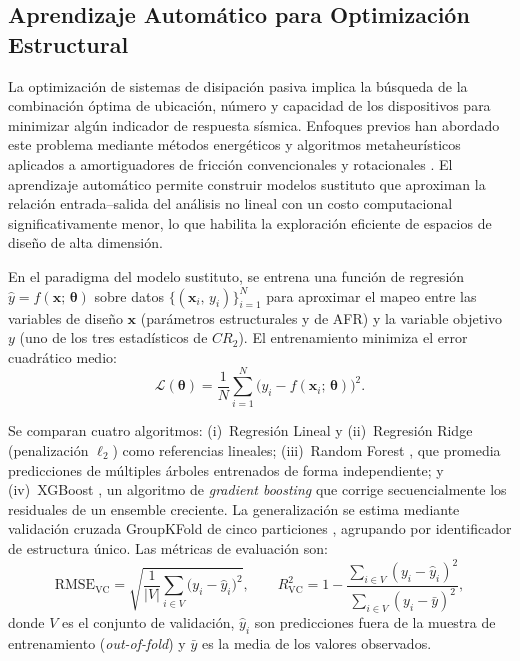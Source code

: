 \documentclass[preprint,12pt,authoryear]{elsarticle}
\newcommand{\RMSE}{\mathrm{RMSE_{VC}}}       %
\newcommand{\Rsq}{R^{2}_{\mathrm{VC}}}
\begin{document}
\subsection{Aprendizaje Automático para Optimización Estructural}
\label{sec:theory:ml}

La optimización de sistemas de disipación pasiva implica la búsqueda de la
combinación óptima de ubicación, número y capacidad de los dispositivos para
minimizar algún indicador de respuesta sísmica. Enfoques previos han abordado
este problema mediante métodos energéticos y algoritmos metaheurísticos aplicados
a amortiguadores de fricción convencionales y rotacionales
\citep{moreschi_design_2003, moghaddam_optimal_2022, ontiveros-perez_reliability-based_2019}.
El aprendizaje automático permite construir modelos sustituto que aproximan la
relación entrada--salida del análisis no lineal con un costo computacional
significativamente menor, lo que habilita la exploración eficiente de espacios
de diseño de alta dimensión.

En el paradigma del modelo sustituto, se entrena una función de regresión
$\hat{y} = f(\bm{x};\,\bm{\theta})$ sobre datos $\{(\bm{x}_i,\,y_i)\}_{i=1}^{N}$
para aproximar el mapeo entre las variables de diseño $\bm{x}$ (parámetros
estructurales y de AFR) y la variable objetivo $y$ (uno de los tres estadísticos
de $CR_2$). El entrenamiento minimiza el error cuadrático medio:
\begin{equation}
    \mathcal{L}(\bm{\theta}) = \frac{1}{N}\sum_{i=1}^{N}
    \bigl(y_i - f(\bm{x}_i;\,\bm{\theta})\bigr)^2.
    \label{eq:mse}
\end{equation}

Se comparan cuatro algoritmos: (i)~Regresión Lineal y (ii)~Regresión Ridge
(penalización $\ell_2$) como referencias lineales; (iii)~Random Forest
\citep{Breiman2001}, que promedia predicciones de múltiples árboles entrenados
de forma independiente; y (iv)~XGBoost \citep{Chen2016}, un algoritmo de
\textit{gradient boosting} que corrige secuencialmente los residuales de un
ensemble creciente. La generalización se estima mediante validación cruzada
GroupKFold de cinco particiones \citep{Kazemi2022}, agrupando por identificador
de estructura único. Las métricas de evaluación son:
\begin{equation}
    \RMSE = \sqrt{\frac{1}{|V|}\sum_{i \in V}\bigl(y_i - \hat{y}_i\bigr)^2},
    \qquad
    \Rsq  = 1 - \frac{\sum_{i \in V}(y_i - \hat{y}_i)^2}
                      {\sum_{i \in V}(y_i - \bar{y})^2},
    \label{eq:metrics}
\end{equation}
donde $V$ es el conjunto de validación, $\hat{y}_i$ son predicciones fuera de la
muestra de entrenamiento (\textit{out-of-fold}) y $\bar{y}$ es la media de los
valores observados.
\end{document}
